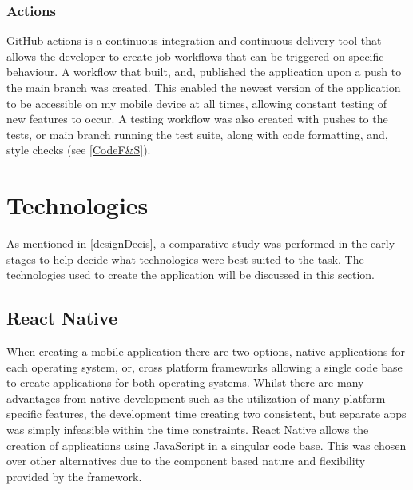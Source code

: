 \subsubsection{Actions}
GitHub actions is a continuous integration and continuous delivery tool that allows the developer to create job workflows that can be triggered on specific behaviour. A workflow that built, and, published the application upon a push to the main branch was created. This enabled the newest version of the application to be accessible on my mobile device at all times, allowing constant testing of new features to occur. A testing workflow was also created with pushes to the tests, or main branch running the test suite, along with code formatting, and, style checks (see \ref{CodeF&S}).
\section{Technologies}
As mentioned in \ref{designDecis}, a comparative study \cite{compStudy} was performed in the early stages to help decide what technologies were best suited to the task. The technologies used to create the application will be discussed in this section.
\subsection{React Native}\label{reactSection}
When creating a mobile application there are two options, native applications for each operating system, or, cross platform frameworks allowing a single code base to create applications for both operating systems. Whilst there are many advantages from native development such as the utilization of many platform specific features, the development time creating two consistent, but separate apps was simply infeasible within the time constraints. React Native \cite{reactnative} allows the creation of applications using JavaScript \cite{js} in a singular code base. This was chosen over other alternatives due to the component based nature and flexibility provided by the framework.
